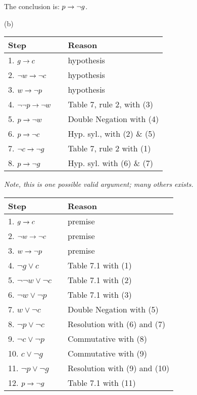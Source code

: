 \begin{questions}
\begin{solution}
  The conclusion is: $p \rightarrow \neg g$.
  
  (b)

    \begin{tabular}{lll}
        Step    & \hspace{0.2in} & Reason \\
        \hline
        1. $g \rightarrow c$                & & hypothesis \\
        2. $\neg w \rightarrow \neg c$          & & hypothesis \\
        3. $w \rightarrow \neg p$             & & hypothesis \\
        4. $\neg \neg p \rightarrow \neg w$   & & Table 7, rule 2, with (3) \\
        5. $p \rightarrow \neg w$       & & Double Negation with (4) \\
        6. $p \rightarrow \neg c$               & & Hyp. syl., with (2) \& (5) \\
        7. $\neg c \rightarrow \neg g$          & & Table 7, rule 2 with (1) \\
        8. $p \rightarrow \neg g$       & & Hyp. syl. with (6) \& (7)
    \end{tabular}
    
    \emph{Note, this is one possible valid argument; many others exists.}

    \begin{tabular}{lll}
        Step    & \hspace{0.2in} & Reason \\
        \hline
        1. $g \rightarrow c$                    & & premise \\
        2. $\neg w \rightarrow \neg c$          & & premise \\
        3. $w \rightarrow \neg p$               & & premise \\
        4. $\neg g \vee c$              & & Table 7.1 with (1) \\
        5. $\neg \neg w \vee \neg c$    & & Table 7.1 with (2) \\
        6. $\neg w \vee \neg p$         & & Table 7.1 with (3) \\
        7. $w \vee \neg c$              & & Double Negation with (5) \\
        8. $\neg p \vee \neg c$         & & Resolution with (6) and (7) \\
        9. $\neg c \vee \neg p$         & & Commutative with (8) \\
        10. $c \vee \neg g$             & & Commutative with (9) \\
        11. $\neg p \vee \neg g$        & & Resolution with (9) and (10) \\
        12. $p \rightarrow \neg g$              & & Table 7.1 with (11)
    \end{tabular}
\end{solution}



\end{questions}
